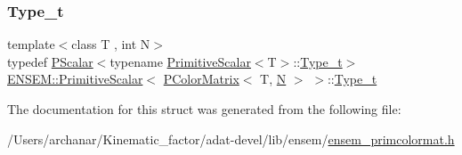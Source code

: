\mbox{\label{structENSEM_1_1PrimitiveScalar_3_01PColorMatrix_3_01T_00_01N_01_4_01_4_ac43408bdf04ddac58e78326690949cbd}} 
\subsubsection{\texorpdfstring{Type\_t}{Type\_t}\hspace{0.1cm}{\footnotesize\ttfamily [3/3]}}
{\footnotesize\ttfamily template$<$class T , int N$>$ \\
typedef \mbox{\hyperlink{classENSEM_1_1PScalar}{P\+Scalar}}$<$typename \mbox{\hyperlink{structENSEM_1_1PrimitiveScalar}{Primitive\+Scalar}}$<$T$>$\+::\mbox{\hyperlink{structENSEM_1_1PrimitiveScalar_3_01PColorMatrix_3_01T_00_01N_01_4_01_4_ac43408bdf04ddac58e78326690949cbd}{Type\+\_\+t}}$>$ \mbox{\hyperlink{structENSEM_1_1PrimitiveScalar}{E\+N\+S\+E\+M\+::\+Primitive\+Scalar}}$<$ \mbox{\hyperlink{classENSEM_1_1PColorMatrix}{P\+Color\+Matrix}}$<$ T, \mbox{\hyperlink{adat__devel_2lib_2hadron_2operator__name__util_8cc_a7722c8ecbb62d99aee7ce68b1752f337}{N}} $>$ $>$\+::\mbox{\hyperlink{structENSEM_1_1PrimitiveScalar_3_01PColorMatrix_3_01T_00_01N_01_4_01_4_ac43408bdf04ddac58e78326690949cbd}{Type\+\_\+t}}}



The documentation for this struct was generated from the following file\+:\begin{DoxyCompactItemize}
\item 
/\+Users/archanar/\+Kinematic\+\_\+factor/adat-\/devel/lib/ensem/\mbox{\hyperlink{adat-devel_2lib_2ensem_2ensem__primcolormat_8h}{ensem\+\_\+primcolormat.\+h}}\end{DoxyCompactItemize}
